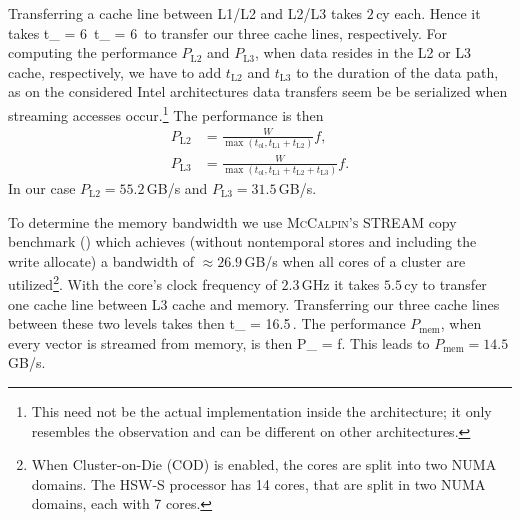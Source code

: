 Transferring a cache line between L1/L2 and L2/L3 takes $2$\,cy each.
Hence it takes
%
\be
  t_ = 6\, \qquad {} \qquad t_ = 6\,
\ee
%
to transfer our three cache lines, respectively.
For computing the performance $P_\text{L2}$ and $P_\text{L3}$, when data resides
in the L2 or L3 cache, respectively, we have to add $t_\text{L2}$ and $t_\text{L3}$
to the duration of the data path, as on the considered Intel architectures data
transfers seem be be serialized when streaming accesses occur.\footnote{This need
not be the actual implementation inside the architecture; it only resembles
the observation and can be different on other architectures.}
The performance is then
%
\begin{align}
  P_\text{L2} &= \frac{W}{\max(t_\text{ol}, t_\text{L1} + t_\text{L2})} f, \\
  P_\text{L3} &= \frac{W}{\max(t_\text{ol}, t_\text{L1} + t_\text{L2} +
t_\text{L3})} f.
\end{align}
%
In our case $P_\text{L2} = 55.2$\,GB/s and $P_\text{L3} = 31.5$\,GB/s.
%

To determine the memory bandwidth we use \textsc{McCalpin's} STREAM copy
benchmark (\cite{mccalpin-1995}) which achieves (without nontemporal stores and
including the write allocate) a bandwidth of $\approx 26.9$\,GB/s when all cores
of a cluster are utilized\footnote{When Cluster-on-Die (COD) is enabled, the cores are split into two NUMA domains. The HSW-S processor has 14 cores, that are split in two NUMA domains, each with 7 cores.}.
With the core's clock frequency of $2.3$\,GHz it takes $5.5$\,cy to transfer one
cache line between L3 cache and memory.
Transferring our three cache lines between these two levels takes then
%
\be
  t_ = 16.5\,.
\ee
%
The performance $P_\text{mem}$, when every vector is streamed from memory, is then
%
\be
  P_ =  f.
\ee
%
This leads to $P_\text{mem} = 14.5$\,GB/s. 

